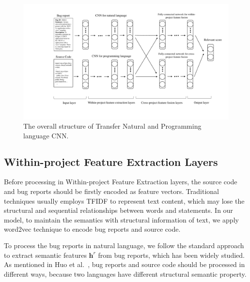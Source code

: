 \begin{figure}[hbt]
\centering
\includegraphics[width = 2\columnwidth]{pic/structure.pdf}
\caption{The overall structure of Transfer Natural and Programming language CNN. }
\label{fig:framework}
\end{figure}

\subsection{Within-project Feature Extraction Layers}
Before processing in Within-project Feature Extraction layers, the source code and bug reports should be firstly encoded as feature vectors. Traditional techniques usually employs TFIDF to represent text content, which may lose the structural and sequential relationships between words and statements. In our model, to maintain the semantics with structural information of text, we apply word2vec technique to encode bug reports and source code.

To process the bug reports in natural language, we follow the standard approach~\cite{kim2014convolutional} to extract semantic features $\mathbf{h}^r$ from bug reports, which has been widely studied. As mentioned in Huo et al.~\cite{huo2016learning}, bug reports and source code should be processed in different ways, because two languages have different structural semantic property.

